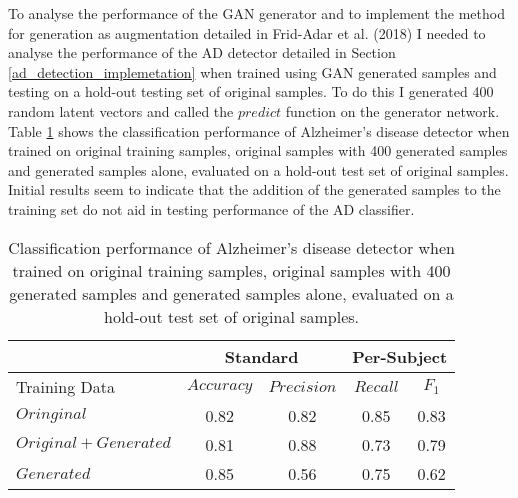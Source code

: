 \documentclass[
    author={Kai Hulme},
    supervisor={Dr Jon Bird},
    degree={BSc},
    title={Generative Adversarial Networks as an Augmentation Technique},
    subtitle={for Alzheimer's Disease Detection in MRI Volumes},
    type={Research},
    year={2021} 
]{dissertation}
\begin{document}

	

To analyse the performance of the GAN generator and to implement the method for generation as augmentation detailed in Frid-Adar et al.  (2018) \cite{frid2018gan} I needed to analyse the performance of the AD detector detailed in Section \ref{ad_detection_implemetation} when trained using GAN generated samples and testing on a hold-out testing set of original samples. To do this I generated 400 random latent vectors and called the $predict$ function on the generator network. \\

Table \ref{gen_as_aug_results} shows the classification performance of Alzheimer's disease detector when trained on original training samples, original samples with 400 generated samples and generated samples alone, evaluated on a hold-out test set of original samples. Initial results seem to indicate that the addition of the generated samples to the training set do not aid in testing performance of the AD classifier.

\begin{table}[t]
    \centering
    \begin{tabular}{|l|c|c|c|c|}
        \hline
        & \multicolumn{2}{|c|}{Standard} & \multicolumn{2}{|c|}{Per-Subject} \\
        \hline 
        Training Data & $Accuracy$ & $Precision$ & $Recall$ & $F_1$ \\ [0.5ex] 
        \hline 
        $Oringinal$            & 0.82 & 0.82 & 0.85 & 0.83 \\ 
        $Original + Generated$ & 0.81 & 0.88 & 0.73 & 0.79 \\ 
        $Generated$            & 0.85 & 0.56 & 0.75 & 0.62 \\ [1ex] 
        \hline
    \end{tabular}
    \caption{Classification performance of Alzheimer's disease detector when trained on original training samples, original samples with 400 generated samples and generated samples alone, evaluated on a hold-out test set of original samples.}
    \label{gen_as_aug_results}
\end{table}
\end{document}
